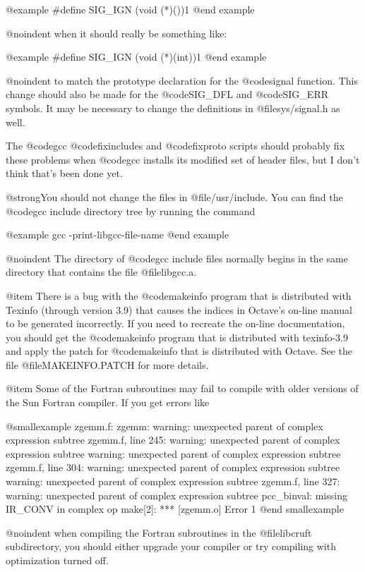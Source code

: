 @example
#define  SIG_IGN  (void (*)())1
@end example

@noindent
when it should really be something like:

@example
#define  SIG_IGN  (void (*)(int))1
@end example

@noindent
to match the prototype declaration for the @code{signal} function.  This
change should also be made for the @code{SIG_DFL} and @code{SIG_ERR}
symbols. It may be necessary to change the definitions in
@file{sys/signal.h} as well.

The @code{gcc} @code{fixincludes} and @code{fixproto} scripts should
probably fix these problems when @code{gcc} installs its modified set of
header files, but I don't think that's been done yet.

@strong{You should not change the files in @file{/usr/include}}.  You
can find the @code{gcc} include directory tree by running the command

@example
gcc -print-libgcc-file-name
@end example

@noindent
The directory of @code{gcc} include files normally begins in the same directory
that contains the file @file{libgcc.a}.

@item
There is a bug with the @code{makeinfo} program that is distributed with
Texinfo (through version 3.9) that causes the indices in Octave's
on-line manual to be generated incorrectly.  If you need to recreate the
on-line documentation, you should get the @code{makeinfo} program that
is distributed with texinfo-3.9 and apply the patch for @code{makeinfo}
that is distributed with Octave.  See the file @file{MAKEINFO.PATCH} for
more details.

@item
Some of the Fortran subroutines may fail to compile with older versions
of the Sun Fortran compiler.  If you get errors like

@smallexample
zgemm.f:
	zgemm:
warning: unexpected parent of complex expression subtree
zgemm.f, line 245: warning: unexpected parent of complex
  expression subtree
warning: unexpected parent of complex expression subtree
zgemm.f, line 304: warning: unexpected parent of complex
  expression subtree
warning: unexpected parent of complex expression subtree
zgemm.f, line 327: warning: unexpected parent of complex
  expression subtree
pcc_binval: missing IR_CONV in complex op
make[2]: *** [zgemm.o] Error 1
@end smallexample

@noindent
when compiling the Fortran subroutines in the @file{libcruft}
subdirectory, you should either upgrade your compiler or try compiling
with optimization turned off.


